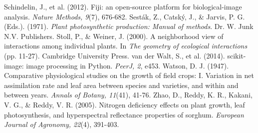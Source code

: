 \documentclass[12pt, a4paper]{article}
\begin{document}
\begin{thebibliography}{99}
		 Schindelin, J., et al. (2012). Fiji: an open-source platform for biological-image analysis. \textit{Nature Methods, 9}(7), 676-682.
		 Sesták, Z., Catský, J., \& Jarvis, P. G. (Eds.). (1971). \textit{Plant photosynthetic production: Manual of methods}. Dr. W. Junk N.V. Publishers.
		 Stoll, P., \& Weiner, J. (2000). A neighborhood view of interactions among individual plants. In \textit{The geometry of ecological interactions} (pp. 11-27). Cambridge University Press.
		 van der Walt, S., et al. (2014). scikit-image: image processing in Python. \textit{PeerJ, 2}, e453.
		 Watson, D. J. (1947). Comparative physiological studies on the growth of field crops: I. Variation in net assimilation rate and leaf area between species and varieties, and within and between years. \textit{Annals of Botany, 11}(41), 41-76.
		 Zhao, D., Reddy, K. R., Kakani, V. G., \& Reddy, V. R. (2005). Nitrogen deficiency effects on plant growth, leaf photosynthesis, and hyperspectral reflectance properties of sorghum. \textit{European Journal of Agronomy, 22}(4), 391-403.
	\end{thebibliography}
	
\end{document}
